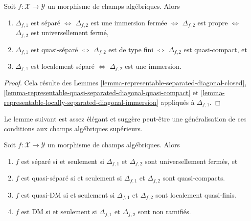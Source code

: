 \begin{lemma}
\label{lemma-first-diagonal-separated-second-diagonal-closed}
Soit $f : \mathcal{X} \to \mathcal{Y}$ un morphisme de champs algébriques.
Alors
\begin{enumerate}
\item $\Delta_{f, 1}$ est séparé $\Leftrightarrow$
$\Delta_{f, 2}$ est une immersion fermée $\Leftrightarrow$
$\Delta_{f, 2}$ est propre $\Leftrightarrow$
$\Delta_{f, 2}$ est universellement fermé,
\item $\Delta_{f, 1}$ est quasi-séparé $\Leftrightarrow$
$\Delta_{f, 2}$ est de type fini $\Leftrightarrow$
$\Delta_{f, 2}$ est quasi-compact, et
\item $\Delta_{f, 1}$ est localement séparé $\Leftrightarrow$
$\Delta_{f, 2}$ est une immersion.
\end{enumerate}
\end{lemma}

\begin{proof}
Cela résulte des Lemmes \ref{lemma-representable-separated-diagonal-closed},
\ref{lemma-representable-quasi-separated-diagonal-quasi-compact} et
\ref{lemma-representable-locally-separated-diagonal-immersion}
appliqués à $\Delta_{f, 1}$.
\end{proof}

\noindent
Le lemme suivant est assez élégant et suggère peut-être une généralisation de
ces conditions aux champs algébriques supérieurs.

\begin{lemma}
\label{lemma-definition-separated}
Soit $f : \mathcal{X} \to \mathcal{Y}$ un morphisme de champs algébriques.
Alors
\begin{enumerate}
\item $f$ est séparé si et seulement si $\Delta_{f, 1}$ et
$\Delta_{f, 2}$ sont universellement fermés, et
\item $f$ est quasi-séparé si et seulement si $\Delta_{f, 1}$ et
$\Delta_{f, 2}$ sont quasi-compacts.
\item $f$ est quasi-DM si et seulement si $\Delta_{f, 1}$ et
$\Delta_{f, 2}$ sont localement quasi-finis.
\item $f$ est DM si et seulement si $\Delta_{f, 1}$ et $\Delta_{f, 2}$
sont non ramifiés.
\end{enumerate}
\end{lemma}

